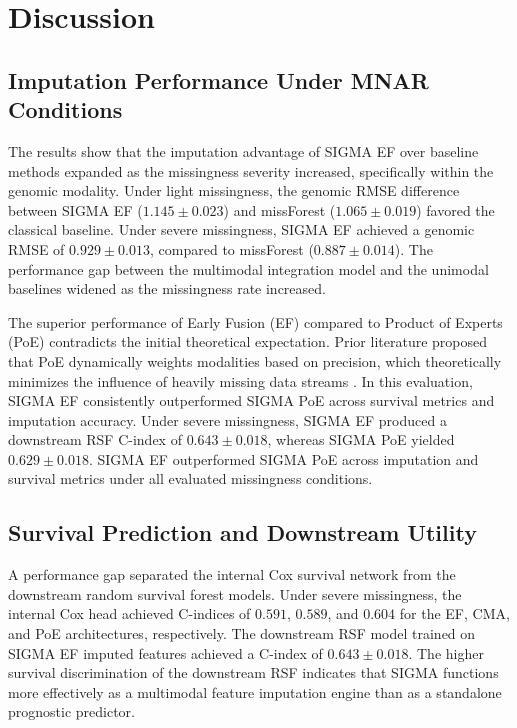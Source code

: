 \documentclass[final,3p,times,authoryear]{elsarticle}
\begin{document}
\section{Discussion}
\label{sec:discussion}

\subsection{Imputation Performance Under MNAR Conditions}
The results show that the imputation advantage of SIGMA EF over baseline methods expanded as the missingness severity increased, specifically within the genomic modality. Under light missingness, the genomic RMSE difference between SIGMA EF ($1.145 \pm 0.023$) and missForest ($1.065 \pm 0.019$) favored the classical baseline. Under severe missingness, SIGMA EF achieved a genomic RMSE of $0.929 \pm 0.013$, compared to missForest ($0.887 \pm 0.014$). The performance gap between the multimodal integration model and the unimodal baselines widened as the missingness rate increased.

The superior performance of Early Fusion (EF) compared to Product of Experts (PoE) contradicts the initial theoretical expectation. Prior literature proposed that PoE dynamically weights modalities based on precision, which theoretically minimizes the influence of heavily missing data streams \citep{wu2018multimodal}. In this evaluation, SIGMA EF consistently outperformed SIGMA PoE across survival metrics and imputation accuracy. Under severe missingness, SIGMA EF produced a downstream RSF C-index of $0.643 \pm 0.018$, whereas SIGMA PoE yielded $0.629 \pm 0.018$. SIGMA EF outperformed SIGMA PoE across imputation and survival metrics under all evaluated missingness conditions.

\subsection{Survival Prediction and Downstream Utility}
A performance gap separated the internal Cox survival network from the downstream random survival forest models. Under severe missingness, the internal Cox head achieved C-indices of $0.591$, $0.589$, and $0.604$ for the EF, CMA, and PoE architectures, respectively. The downstream RSF model trained on SIGMA EF imputed features achieved a C-index of $0.643 \pm 0.018$. The higher survival discrimination of the downstream RSF indicates that SIGMA functions more effectively as a multimodal feature imputation engine than as a standalone prognostic predictor.
\end{document}
